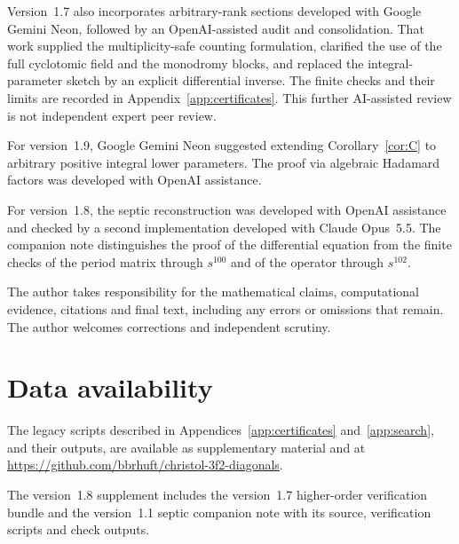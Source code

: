 \documentclass[11pt]{amsart}
\theoremstyle{definition}
\theoremstyle{remark}
\numberwithin{equation}{section}
\begin{document}
Version~1.7 also incorporates arbitrary-rank sections developed with Google Gemini Neon, followed by an OpenAI-assisted audit and consolidation. That work supplied the multiplicity-safe counting formulation, clarified the use of the full cyclotomic field and the monodromy blocks, and replaced the integral-parameter sketch by an explicit differential inverse. The finite checks and their limits are recorded in Appendix~\ref{app:certificates}. This further AI-assisted review is not independent expert peer review.

For version~1.9, Google Gemini Neon suggested extending Corollary~\ref{cor:C} to arbitrary positive integral lower parameters. The proof via algebraic Hadamard factors was developed with OpenAI assistance.

For version~1.8, the septic reconstruction was developed with OpenAI assistance and checked by a second implementation developed with Claude Opus~5.5. The companion note distinguishes the proof of the differential equation from the finite checks of the period matrix through $s^{100}$ and of the operator through $s^{102}$.

The author takes responsibility for the mathematical claims,
computational evidence, citations and final text, including any
errors or omissions that remain. The author welcomes corrections 
and independent scrutiny.

\section*{Data availability}
The legacy scripts described in Appendices~\ref{app:certificates} and~\ref{app:search}, and their outputs, are available as supplementary material and at \url{https://github.com/bbrhuft/christol-3f2-diagonals}.

The version~1.8 supplement includes the version~1.7 higher-order verification bundle and the version~1.1 septic companion note with its source, verification scripts and check outputs.
\end{document}
